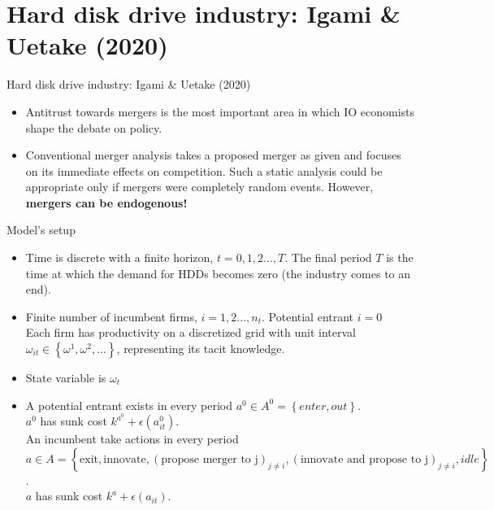 \documentclass[aspectratio=169]{beamer}  %
\begin{document}
\section{Hard disk drive industry: Igami \& Uetake (2020)}
\begin{frame}{Hard disk drive industry: Igami \& Uetake (2020)}
    \begin{itemize}
    \item Antitrust towards mergers is the most important area in which IO economists shape the debate on policy.
    \item Conventional merger analysis takes a proposed merger as given and focuses on its immediate effects on competition. Such a static analysis could be appropriate only if mergers were completely random events. However, \textbf{mergers can be endogenous!}
    
    \end{itemize}
\end{frame}

\begin{frame}{Model's setup}
    \begin{itemize}
    \item Time is discrete with a finite horizon, $t=0, 1, 2...,T$. The final period $T$ is the time at which the demand for HDDs becomes zero (the industry comes to an end).
    \item Finite number of incumbent firms, $i=1,2...,n_t$. Potential entrant $i=0$ \\
    Each firm has productivity on a discretized grid with unit interval $\omega_{it} \in \left\{ \omega^1, \omega^2,...\right\}$, representing its tacit knowledge.
    \item State variable is $\omega_t$ 
    \item A potential entrant exists in every period $a^0 \in A^0=\left\{ enter, out\right\}$. \\
    $a^0$ has sunk cost $k^{a^0}+\epsilon(a_{it}^0)$. \\
    An incumbent take actions in every period $a \in A=\left\{\text{exit}, \text{innovate}, (\text{propose  merger  to j})_{j≠i},(\text{innovate and propose to j})_{j≠i}, idle \right\}$. \\
     $a$ has sunk cost $k^{a}+\epsilon(a_{it})$. \\
   
    \end{itemize}
\end{frame}
\end{document}
